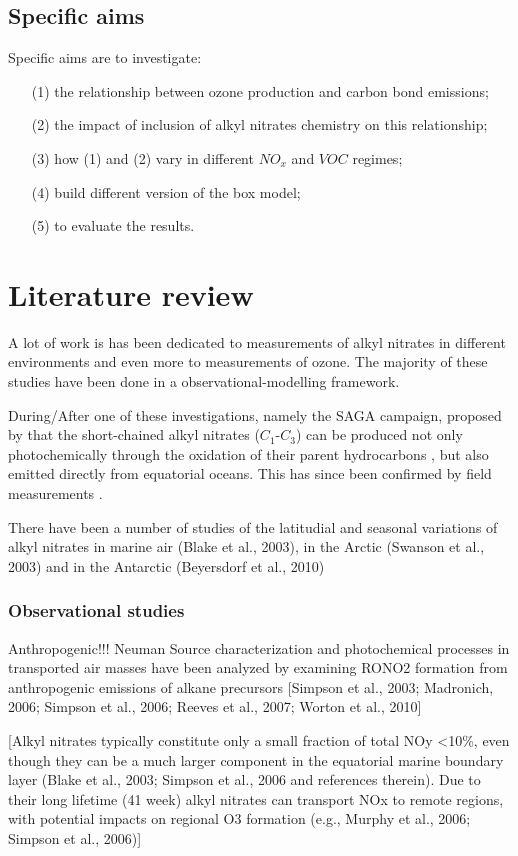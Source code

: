 \documentclass[11pt,a4paper]{article}
\begin{document}
\subsection{Specific aims}
Specific aims are to investigate:
\begin{itemize}
\item[(1)] the relationship between ozone production and carbon bond emissions;
\item[(2)] the impact of inclusion of alkyl nitrates chemistry on this relationship;
\item[(3)] how (1) and (2) vary in different $NO_x$ and $VOC$ regimes;
\item[(4)] build different version of the box model;
\item[(5)] to evaluate the results.
\end{itemize}

\section{Literature review} \label{sec:lit_review}
A lot of work is has been dedicated to measurements of alkyl nitrates in different environments and even more to measurements of ozone. The majority of these studies have been done in a observational-modelling framework.

During/After one of these investigations, namely the SAGA campaign, \citep{Atlas1993} proposed by that the short-chained alkyl nitrates ($C_1$-$C_3$) can be produced not only photochemically through the oxidation of their parent hydrocarbons \citep{Roberts1990}, but also emitted directly from equatorial oceans. This has since been
confirmed by field measurements \citep{Chuck2002,Blake2003,Dalh2005}.

There have been a number of studies of the latitudial and seasonal variations of alkyl nitrates in marine air (Blake et al., 2003), in the Arctic (Swanson et al., 2003) and in the
Antarctic (Beyersdorf et al., 2010)
\subsubsection{Observational studies}
Anthropogenic!!! Neuman
Source characterization and photochemical processes in transported air masses have been analyzed by examining RONO2 formation from anthropogenic emissions of alkane precursors [Simpson et al., 2003; Madronich, 2006; Simpson et al., 2006; Reeves et al., 2007; Worton
et al., 2010]

\citep{Sommariva2008}
[Alkyl nitrates typically constitute only a small
fraction of total NOy <10\%, even though they can be a much larger component in the equatorial marine boundary layer (Blake et al., 2003; Simpson et al., 2006 and references therein). Due to their long lifetime (41 week) alkyl nitrates can transport NOx to remote regions, with potential impacts on regional O3 formation (e.g., Murphy et al., 2006; Simpson et al., 2006)]
\end{document}
